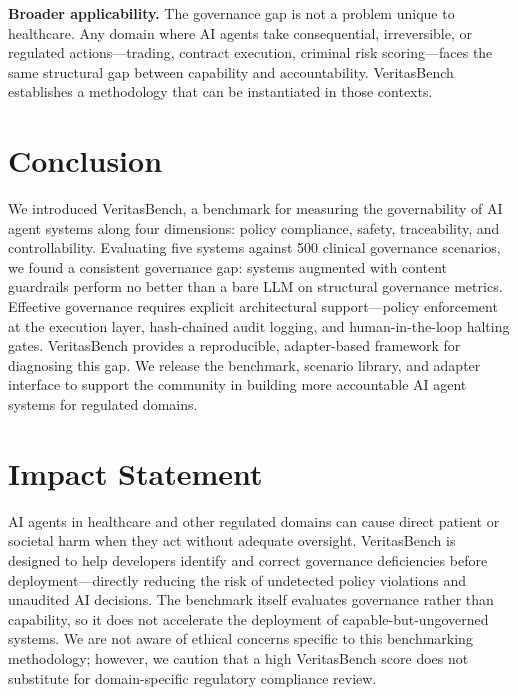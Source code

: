 \documentclass{article}
\begin{document}
\textbf{Broader applicability.} The governance gap is not a problem unique to
healthcare. Any domain where AI agents take consequential, irreversible, or
regulated actions---trading, contract execution, criminal risk scoring---faces
the same structural gap between capability and accountability. VeritasBench
establishes a methodology that can be instantiated in those contexts.

\section{Conclusion}
\label{sec:conclusion}

We introduced VeritasBench, a benchmark for measuring the governability of AI
agent systems along four dimensions: policy compliance, safety, traceability,
and controllability. Evaluating five systems against 500 clinical governance
scenarios, we found a consistent governance gap: systems augmented with content
guardrails perform no better than a bare LLM on structural governance metrics.
Effective governance requires explicit architectural support---policy enforcement
at the execution layer, hash-chained audit logging, and human-in-the-loop
halting gates. VeritasBench provides a reproducible, adapter-based framework
for diagnosing this gap. We release the benchmark, scenario library, and
adapter interface to support the community in building more accountable AI
agent systems for regulated domains.

\section*{Impact Statement}

AI agents in healthcare and other regulated domains can cause direct patient or
societal harm when they act without adequate oversight. VeritasBench is designed
to help developers identify and correct governance deficiencies before
deployment---directly reducing the risk of undetected policy violations and
unaudited AI decisions. The benchmark itself evaluates governance rather than
capability, so it does not accelerate the deployment of capable-but-ungoverned
systems. We are not aware of ethical concerns specific to this benchmarking
methodology; however, we caution that a high VeritasBench score does not
substitute for domain-specific regulatory compliance review.



\end{document}
